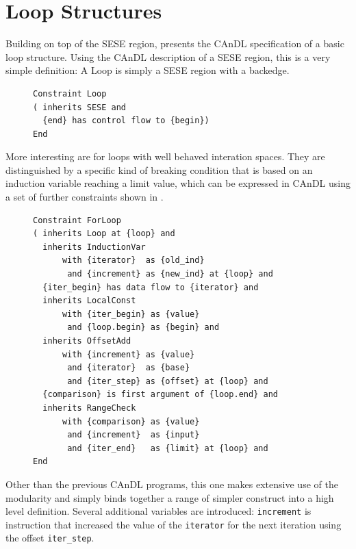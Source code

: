 \section{Loop Structures}
    Building on top of the SESE region,  presents the CAnDL
    specification of a basic loop structure.
    Using the CAnDL description of a SESE region, this is a very simple
    definition: A Loop is simply a SESE region with a backedge.

\begin{figure}[h]
\begin{lstlisting}[language=CAnDL,label={candl_loop},caption=
   {Loop in CAnDL}]
Constraint Loop
( inherits SESE and
  {end} has control flow to {begin})
End
\end{lstlisting}
\end{figure}

    More interesting are for loops with well behaved interation spaces.
    They are distinguished by a specific kind of breaking condition that is
    based on an induction variable reaching a limit value, which can be
    expressed in CAnDL using a set of further constraints shown in
    .

\begin{figure}[h]
\begin{lstlisting}[language=CAnDL,
                   label={candl_forloop},caption={For Loop in IDL}]
Constraint ForLoop
( inherits Loop at {loop} and
  inherits InductionVar
      with {iterator}  as {old_ind}
       and {increment} as {new_ind} at {loop} and
  {iter_begin} has data flow to {iterator} and
  inherits LocalConst
      with {iter_begin} as {value}
       and {loop.begin} as {begin} and
  inherits OffsetAdd
      with {increment} as {value}
       and {iterator}  as {base}
       and {iter_step} as {offset} at {loop} and
  {comparison} is first argument of {loop.end} and
  inherits RangeCheck
      with {comparison} as {value}
       and {increment}  as {input}
       and {iter_end}   as {limit} at {loop} and
End
\end{lstlisting}
\end{figure}

    Other than the previous CAnDL programs, this one makes extensive use of
    the modularity and simply binds together a range of simpler construct into
    a high level definition.
    Several additional variables are introduced: {\tt increment} is instruction
    that increased the value of the {\tt iterator} for the next iteration using
    the offset {\tt iter\_step}.

